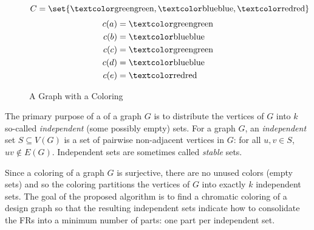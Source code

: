 \begin{figure}[h]
  \label{fig:exchromatic}
  \begin{minipage}[t]{3in}
    \begin{center}
      \vspace{0in}
    \end{center}
  \end{minipage}
  \begin{minipage}[t]{3in}
    \[C=\set{\mtxtclr{green},\mtxtclr{blue},\mtxtclr{red}}\]
    \begin{align*}
      c(a) &= \mtxtclr{green} \\
      c(b) &= \mtxtclr{blue} \\
      c(c) &= \mtxtclr{green} \\
      c(d) &= \mtxtclr{blue} \\
      c(e) &= \mtxtclr{red}
    \end{align*}
  \end{minipage}
  \caption{A Graph with a  Coloring}
\end{figure}

The primary purpose of a  of a graph \(G\) is to distribute the vertices of \(G\) into \(k\) so-called
\emph{independent} (some possibly empty) sets.  For a graph \(G\), an \emph{independent} set \(S\subseteq V(G)\) is
a set of pairwise non-adjacent vertices in \(G\): for all \(u,v\in S\), \(uv\notin E(G)\).  Independent sets are
sometimes called \emph{stable} sets.

Since a  coloring of a graph \(G\) is surjective, there are no unused colors (empty sets) and so the
coloring partitions the vertices of \(G\) into exactly \(k\) independent sets.  The goal of the proposed algorithm
is to find a chromatic coloring of a design graph so that the resulting independent sets indicate how to
consolidate the FRs into a minimum number of parts: one part per independent set.

